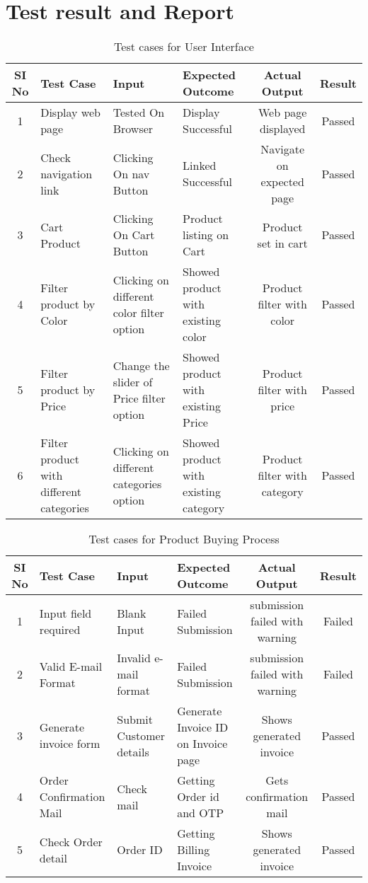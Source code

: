 \section{Test result and Report}
\begin{table}[H]
    \centering
    \caption{Test cases for User Interface}
    \label{tab:test-cases-ui}
    \begin{tabular}{|c|p{3cm}|p{3cm}|p{3cm}|c|c|}
        \hline
        \textbf{SI No} & \textbf{Test Case} & \textbf{Input} & \textbf{Expected Outcome} & \textbf{Actual Output} & \textbf{Result} \\ \hline
        1 & Display web page & Tested On Browser & Display Successful & Web page displayed & Passed \\ \hline
        2 & Check navigation link & Clicking On nav Button & Linked Successful & Navigate on expected page & Passed \\ \hline
        3 & Cart Product & Clicking On Cart Button & Product listing on Cart & Product set in cart & Passed \\ \hline
        4 & Filter product by Color & Clicking on different color filter option & Showed product with existing color & Product filter with color & Passed \\ \hline
        5 & Filter product by Price & Change the slider of Price filter option & Showed product with existing Price & Product filter with price & Passed \\ \hline
        6 & Filter product with different categories & Clicking on different categories option & Showed product with existing category & Product filter with category & Passed \\ \hline
    \end{tabular}
\end{table}

\begin{table}[H]
    \centering
    \caption{Test cases for Product Buying Process}
    \label{tab:test-cases-buying-process}
    \begin{tabular}{|c|p{3cm}|p{3cm}|p{3cm}|c|c|}
        \hline
        \textbf{SI No} & \textbf{Test Case} & \textbf{Input} & \textbf{Expected Outcome} & \textbf{Actual Output} & \textbf{Result} \\ \hline
        1 & Input field required & Blank Input & Failed Submission & submission failed with warning & Failed \\ \hline
        2 & Valid E-mail Format & Invalid e-mail format & Failed Submission & submission failed with warning & Failed \\ \hline
        3 & Generate invoice form & Submit Customer details & Generate Invoice ID on Invoice page & Shows generated invoice & Passed \\ \hline
        4 & Order Confirmation Mail & Check mail & Getting Order id and OTP & Gets confirmation mail & Passed \\ \hline
        5 & Check Order detail & Order ID & Getting Billing Invoice & Shows generated invoice & Passed \\ \hline
    \end{tabular}
\end{table}

